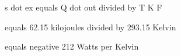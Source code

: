 s dot ex equals Q dot out divided by T K F

equals 62.15 kilojoules divided by 293.15 Kelvin

equals negative 212 Watts per Kelvin